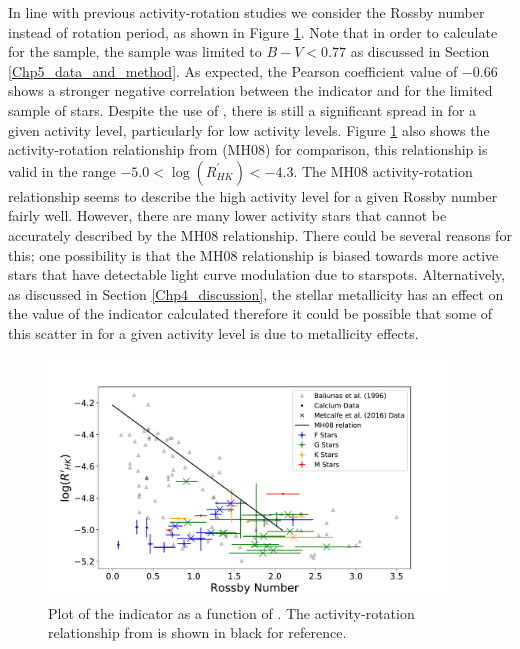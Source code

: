In line with previous activity-rotation studies \citep{Mamajek_Hillenbrand_2008,Metcalfe_etal_2016} we consider the Rossby number instead of rotation period, as shown in Figure \ref{fig:rhk_v_ro}. Note that in order to calculate \Ro for the \citet{Baliunas_etal_1996} sample, the sample was limited to $B-V < 0.77$ as discussed in Section \ref{Chp5_data_and_method}. As expected, the Pearson coefficient value of $-0.66$ shows a stronger negative correlation between the \Rprime indicator and \Ro for the limited \citet{Baliunas_etal_1996} sample of stars. Despite the use of \Ro, there is still a significant spread in \Ro for a given activity level, particularly for low activity levels. Figure \ref{fig:rhk_v_ro} also shows the activity-rotation relationship from \citet{Mamajek_Hillenbrand_2008} (MH08) for comparison, this relationship is valid in the range $-5.0 < \log(R^{'}_{HK}) < -4.3$. The MH08 activity-rotation relationship seems to describe the high activity level for a given Rossby number fairly well. However, there are many lower activity stars that cannot be accurately described by the MH08 relationship. There could be several reasons for this; one possibility is that the MH08 relationship is biased towards more active stars that have detectable light curve modulation due to starspots. Alternatively, as discussed in Section \ref{Chp4_discussion}, the stellar metallicity has an effect on the value of the \Rprime indicator calculated therefore it could be possible that some of this scatter in \Ro for a given activity level is due to metallicity effects.

\begin{figure}
    \centering
    \includegraphics[width=0.95\textwidth]{Figures/5-Activity_rotation/rhk_v_r0.pdf}
    \caption[\Rprime indicator as a function of \Ro]{Plot of the \Rprime indicator as a function of \Ro. The activity-rotation relationship from \citet{Mamajek_Hillenbrand_2008} is shown in black for reference.}
    \label{fig:rhk_v_ro}
\end{figure}

